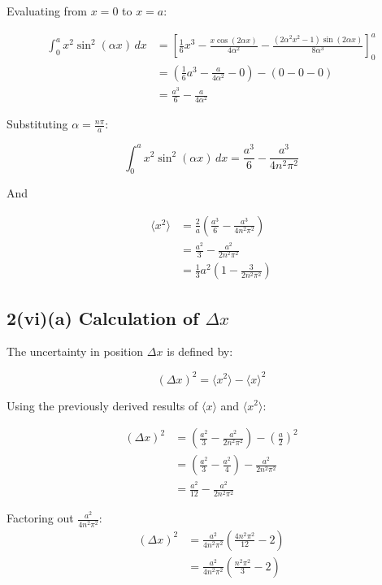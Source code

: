 \documentclass{article}
\begin{document}
Evaluating from $x = 0$ to $x = a$:

\begin{align*}
\int_0^a x^2 \sin^2(\alpha x) \, dx &= \left[ \frac{1}{6}x^3 - \frac{x \cos(2\alpha x)}{4\alpha^2} - \frac{(2\alpha^2 x^2 - 1)\sin(2\alpha x)}{8\alpha^3} \right]_0^a \\
&= \left( \frac{1}{6}a^3 - \frac{a}{4\alpha^2} - 0 \right) - (0 - 0 - 0) \\
&= \frac{a^3}{6} - \frac{a}{4\alpha^2}
\end{align*}

Substituting $\alpha = \frac{n\pi}{a}$:

\begin{equation*}
\int_0^a x^2 \sin^2(\alpha x) \, dx = \frac{a^3}{6} - \frac{a^3}{4n^2\pi^2}
\end{equation*}

And

\begin{align*}
\langle x^2 \rangle &= \frac{2}{a} \left( \frac{a^3}{6} - \frac{a^3}{4n^2\pi^2} \right) \\
&= \frac{a^2}{3} - \frac{a^2}{2n^2\pi^2} \\
&= \frac{1}{3}a^2 \left( 1 - \frac{3}{2n^2\pi^2} \right)
\end{align*}


\subsection*{2(vi)(a) Calculation of $\Delta x$}

The uncertainty in position $\Delta x$ is defined by:

\begin{equation*}
(\Delta x)^2 = \langle x^2 \rangle - \langle x \rangle^2
\end{equation*}

Using the previously derived results of $\langle x \rangle$ and $\langle x^2 \rangle$:

\begin{align*}
(\Delta x)^2 &= \left( \frac{a^2}{3} - \frac{a^2}{2n^2\pi^2} \right) - \left( \frac{a}{2} \right)^2 \\
&= \left( \frac{a^2}{3} - \frac{a^2}{4} \right) - \frac{a^2}{2n^2\pi^2} \\
&= \frac{a^2}{12} - \frac{a^2}{2n^2\pi^2}
\end{align*}

Factoring out $\frac{a^2}{4n^2\pi^2}$:
\begin{align*}
(\Delta x)^2 &= \frac{a^2}{4n^2\pi^2} \left( \frac{4n^2\pi^2}{12} - 2 \right) \\
&= \frac{a^2}{4n^2\pi^2} \left( \frac{n^2\pi^2}{3} - 2 \right)
\end{align*}
\end{document}
